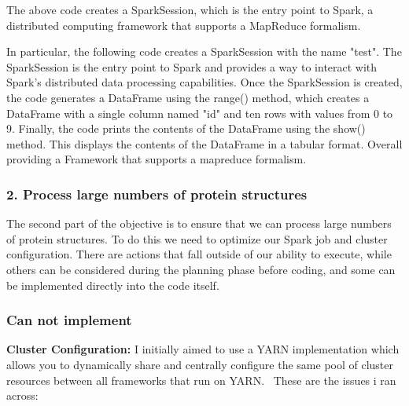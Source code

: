 \documentclass[]{final_report}
\begin{document}
The above code creates a SparkSession, which is the entry point to Spark, a distributed computing framework that supports a MapReduce formalism.

In particular, the following code creates a SparkSession with the name "test". The SparkSession is the entry point to Spark and provides a way to interact with Spark's distributed data processing capabilities. Once the SparkSession is created, the code generates a DataFrame using the range() method, which creates a DataFrame with a single column named "id" and ten rows with values from 0 to 9. Finally, the code prints the contents of the DataFrame using the show() method. This displays the contents of the DataFrame in a tabular format. Overall providing a Framework that supports a mapreduce formalism.

\clearpage

\subsubsection{2. Process large numbers of protein structures}

The second part of the objective is to ensure that we can process large numbers of protein structures. To do this we need to optimize our Spark job and cluster configuration. There are actions that fall outside of our ability to execute, while others can be considered during the planning phase before coding, and some can be implemented directly into the code itself.

\subsubsection{Can not implement}
\textbf{Cluster Configuration:} I initially aimed to use a YARN implementation which allows you to dynamically share and centrally configure the same pool of cluster resources between all frameworks that run on YARN.~\cite{goyal_spark_2018} These are the issues i ran across:
\end{document}
